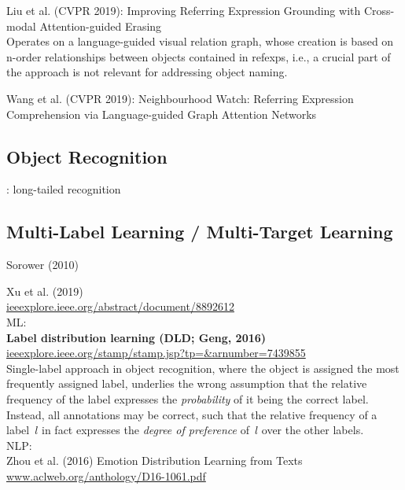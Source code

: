\documentclass[11pt,a4paper]{article}
\begin{document}
\noindent
Liu et al. (CVPR 2019): Improving Referring Expression Grounding
with Cross-modal Attention-guided Erasing\\
Operates on a language-guided visual relation graph, whose creation is based on  n-order relationships between objects contained in refexps, i.e., a crucial part of the approach is not relevant for addressing object naming.

\noindent
Wang et al. (CVPR 2019): Neighbourhood Watch: Referring Expression Comprehension via
Language-guided Graph Attention Networks\\

\subsection{Object Recognition}
: long-tailed recognition

\subsection{Multi-Label Learning / Multi-Target Learning}
Sorower (2010)

\noindent
Xu et al. (2019)\\
\url{ieeexplore.ieee.org/abstract/document/8892612}\\

\noindent
ML:\\
\textbf{Label distribution learning (DLD; Geng, 2016)}\\ \url{ieeexplore.ieee.org/stamp/stamp.jsp?tp=&arnumber=7439855}\\
Single-label approach in object recognition, where the object is assigned the most frequently assigned label, underlies the wrong assumption that the relative frequency of the label expresses the \textit{probability} of it being the correct label. Instead, all annotations may be correct, such that the relative frequency of a label~$l$ in fact expresses the \textit{degree of preference} of~$l$ over the other labels.   \\ 

\noindent
NLP:\\
Zhou et al. (2016) Emotion Distribution Learning from Texts\\
\url{www.aclweb.org/anthology/D16-1061.pdf}\\
\end{document}
